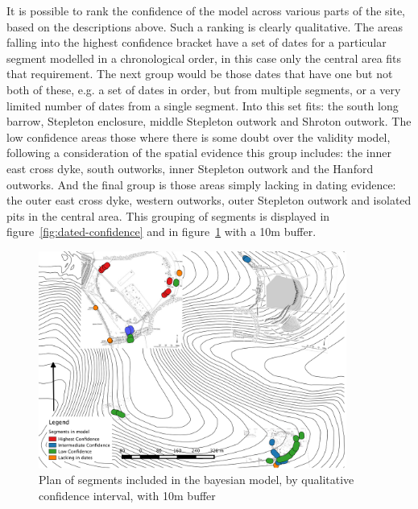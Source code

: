 It is possible to rank the confidence of the model across various parts of the site, based on the descriptions above. Such a ranking is clearly qualitative. The areas falling into the highest confidence bracket have a set of dates for a particular segment modelled in a chronological order,  in this case only the central area fits that requirement. The next group would be those dates that have one but not both of these, e.g. a set of dates in order, but from multiple segments, or a very limited number of dates from a single segment. Into this set fits: the south long barrow, Stepleton enclosure, middle Stepleton outwork and Shroton outwork. The low confidence areas those where there is some doubt over the validity model, following a consideration of the spatial evidence this group includes: the inner east cross dyke, south outworks, inner Stepleton outwork and the Hanford outworks. And the final group is those areas simply lacking in dating evidence: the outer east cross dyke, western outworks, outer Stepleton outwork and isolated pits in the central area. This grouping of segments is displayed in figure~\ref{fig:dated-confidence} and in figure~\ref{fig:dated-confidence-buffer} with a 10m buffer. 

\begin{figure}
\centering
	\includegraphics[width=0.9\textwidth]{figures/dated-confidence-buffer}
  \caption{Plan of segments included in the bayesian model, by qualitative confidence interval, with 10m buffer}
  \label{fig:dated-confidence-buffer}
\end{figure}

